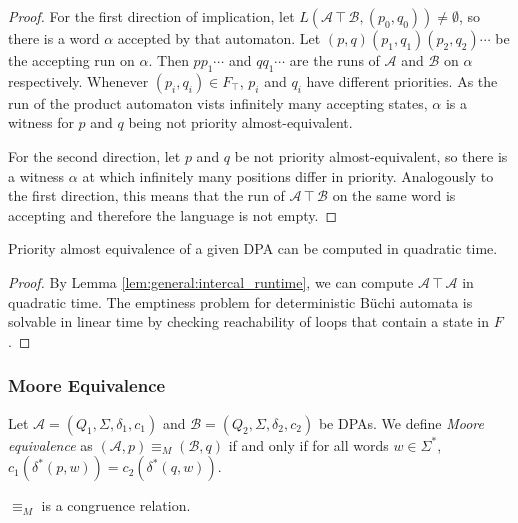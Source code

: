 \begin{proof}
	For the first direction of implication, let $L(\mathcal{A} \intercal \mathcal{B}, (p_0, q_0)) \neq \emptyset$, so there is a word $\alpha$ accepted by that automaton. Let $(p, q) (p_1, q_1) (p_2, q_2) \cdots$ be the accepting run on $\alpha$. Then $p p_1 \cdots$ and $q q_1 \cdots$ are the runs of $\mathcal{A}$ and $\mathcal{B}$ on $\alpha$ respectively. Whenever $(p_i, q_i) \in F_\intercal$, $p_i$ and $q_i$ have different priorities. As the run of the product automaton vists infinitely many accepting states, $\alpha$ is a witness for $p$ and $q$ being not priority almost-equivalent.
	
	For the second direction, let $p$ and $q$ be not priority almost-equivalent, so there is a witness $\alpha$ at which infinitely many positions differ in priority. Analogously to the first direction, this means that the run of $\mathcal{A} \intercal \mathcal{B}$ on the same word is accepting and therefore the language is not empty.
\end{proof}

\begin{cor}
	Priority almost equivalence of a given DPA can be computed in quadratic time.
\end{cor}

\begin{proof}
	By Lemma \ref{lem:general:intercal_runtime}, we can compute $\mathcal{A} \intercal \mathcal{A}$ in quadratic time. The emptiness problem for deterministic B\"uchi automata is solvable in linear time by checking reachability of loops that contain a state in $F$. 
\end{proof}

\vspace{5pt}

\subsubsection{Moore Equivalence}

\begin{defn}
	Let $\mathcal{A} = (Q_1, \Sigma, \delta_1, c_1)$ and $\mathcal{B} = (Q_2, \Sigma, \delta_2, c_2)$ be DPAs. We define \emph{Moore equivalence} as $(\mathcal{A}, p) \equiv_M (\mathcal{B}, q)$ if and only if for all words $w \in \Sigma^*$, $c_1(\delta^*(p, w)) = c_2(\delta^*(q, w))$.
\end{defn}

\begin{lem}
	$\equiv_M$ is a congruence relation.
	\label{lem:general:M_congruence}
\end{lem}


